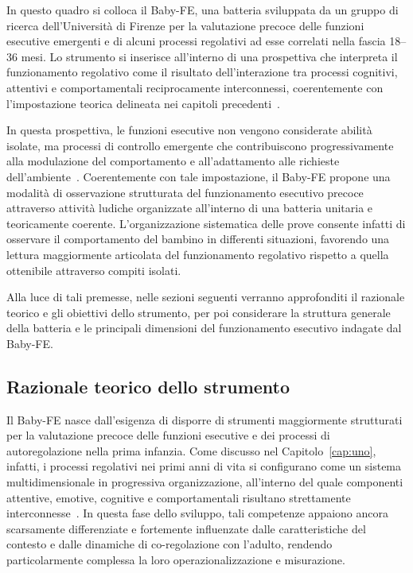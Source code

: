         In questo quadro si colloca il Baby-FE, una batteria sviluppata da un gruppo di ricerca dell'Università di Firenze per la valutazione precoce delle funzioni esecutive emergenti e di alcuni processi regolativi ad esse correlati nella fascia 18--36 mesi. Lo strumento si inserisce all'interno di una prospettiva che interpreta il funzionamento regolativo come il risultato dell'interazione tra processi cognitivi, attentivi e comportamentali reciprocamente interconnessi, coerentemente con l'impostazione teorica delineata nei capitoli precedenti~\cite{calkins2007,diamond2013}.

        In questa prospettiva, le funzioni esecutive non vengono considerate abilità isolate, ma processi di controllo emergente che contribuiscono progressivamente alla modulazione del comportamento e all'adattamento alle richieste dell'ambiente~\cite{zelazo2003,diamond2013}. Coerentemente con tale impostazione, il Baby-FE propone una modalità di osservazione strutturata del funzionamento esecutivo precoce attraverso attività ludiche organizzate all'interno di una batteria unitaria e teoricamente coerente. L'organizzazione sistematica delle prove consente infatti di osservare il comportamento del bambino in differenti situazioni, favorendo una lettura maggiormente articolata del funzionamento regolativo rispetto a quella ottenibile attraverso compiti isolati.

        Alla luce di tali premesse, nelle sezioni seguenti verranno approfonditi il razionale teorico e gli obiettivi dello strumento, per poi considerare la struttura generale della batteria e le principali dimensioni del funzionamento esecutivo indagate dal Baby-FE.

        \subsection{Razionale teorico dello strumento}
        \label{sec:3_7_1}

            Il Baby-FE nasce dall'esigenza di disporre di strumenti maggiormente strutturati per la valutazione precoce delle funzioni esecutive e dei processi di autoregolazione nella prima infanzia. Come discusso nel Capitolo~\ref{cap:uno}, infatti, i processi regolativi nei primi anni di vita si configurano come un sistema multidimensionale in progressiva organizzazione, all'interno del quale componenti attentive, emotive, cognitive e comportamentali risultano strettamente interconnesse~\cite{calkins2002fox,blair2011ursache}. In questa fase dello sviluppo, tali competenze appaiono ancora scarsamente differenziate e fortemente influenzate dalle caratteristiche del contesto e dalle dinamiche di co-regolazione con l'adulto, rendendo particolarmente complessa la loro operazionalizzazione e misurazione.

